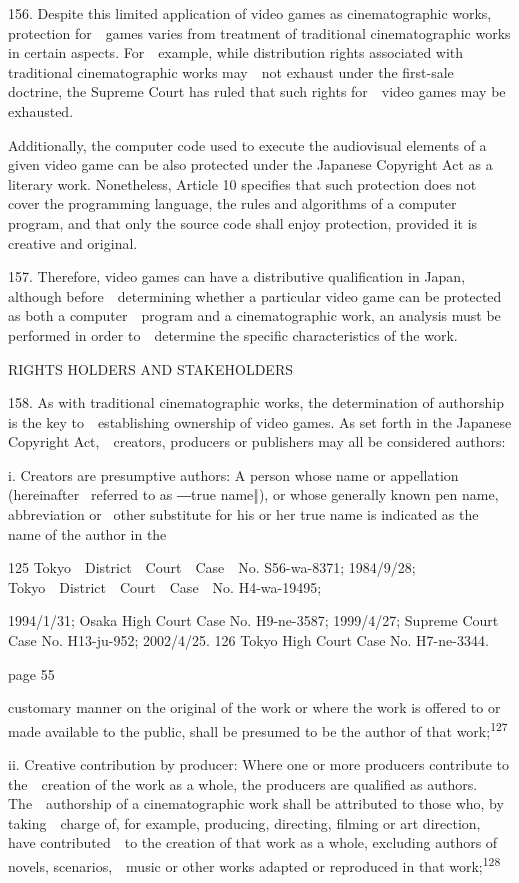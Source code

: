 \documentclass[
]{article}
\begin{document}
{156. }{Despite this limited application of video games as
cinematographic works, protection for~~games varies from treatment of
traditional cinematographic works in certain aspects. For~~example,
while distribution rights associated with traditional cinematographic
works may~~not exhaust under the first-sale doctrine, the Supreme Court
has ruled that such rights for~~video games may be exhausted.}

{Additionally, the computer code used to execute the audiovisual
elements of a given video game can be also protected under the Japanese
}{Copyright Act }{as a literary work. Nonetheless, Article 10 specifies
that such protection does not cover the programming language, the rules
and algorithms of a computer program, and that only the source code
shall enjoy protection, provided it is creative and original.}

{157. }{Therefore, video games can have a distributive qualification in
Japan, although before~~determining whether a particular video game can
be protected as both a computer~~program and a cinematographic work, an
analysis must be performed in order to~~determine the specific
characteristics of the work.}

{RIGHTS HOLDERS AND STAKEHOLDERS}

{158. }{As with traditional cinematographic works, the determination of
authorship is the key to~~establishing ownership of video games. As set
forth in the Japanese }{Copyright Act}{,~~creators, producers or
publishers may all be considered authors:}

{i. Creators are presumptive authors: A person whose name or appellation
(hereinafter }{~referred to as ―true name‖), or whose generally known
pen name, abbreviation or }{~other substitute for his or her true name
is indicated as the name of the author in the}

{125 }{Tokyo~~District~~Court~~Case~~No. S56-wa-8371; 1984/9/28;
Tokyo~~District~~Court~~Case~~No. H4-wa-19495;}

{1994/1/31; Osaka High Court Case No. H9-ne-3587; 1999/4/27; Supreme
Court Case No. H13-ju-952; 2002/4/25. }{126 }{Tokyo High Court Case No.
H7-ne-3344.}

{page 55}

{customary manner on the original of the work or where the work is
offered to or made available to the public, shall be presumed to be the
author of that work;}\textsuperscript{{127}}

{ii. Creative contribution by producer: Where one or more producers
contribute to the~~creation of the work as a whole, the producers are
qualified as authors. The~~authorship of a cinematographic work shall be
attributed to those who, by taking~~charge of, for example, producing,
directing, filming or art direction, have contributed~~to the creation
of that work as a whole, excluding authors of novels, scenarios,~~music
or other works adapted or reproduced in that
work;}\textsuperscript{{128}}
\end{document}
